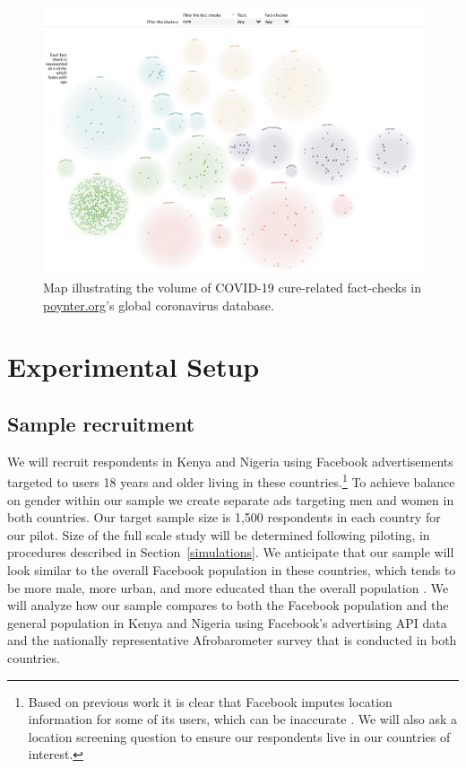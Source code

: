 \documentclass[letterpaper, 12pt, parskip=full,]{scrartcl}
\begin{document}




\begin{figure}[t]
\centering
\caption{Map illustrating the volume of COVID-19 cure-related fact-checks in \url{poynter.org}'s global coronavirus database.}
\label{fig:poynter_cures}
\includegraphics[width=.95\textwidth]{poynter_cures.png} 
\end{figure}


\FloatBarrier
\section{Experimental Setup}



\subsection{Sample recruitment}
We will recruit respondents in Kenya and Nigeria using Facebook advertisements targeted to users 18 years and older living in these countries.\footnote{Based on previous work it is clear that Facebook imputes location information for some of its users, which can be inaccurate \citep{Rosenzweig_2020}. We will also ask a location screening question to ensure our respondents live in our countries of interest.} %
To achieve balance on gender within our sample we create separate ads targeting men and women in both countries. Our target sample size is 1,500 respondents in each country for our pilot. Size of the full scale study will be determined following piloting, in procedures described in Section~\ref{simulations}. We anticipate that our sample will look similar to the overall Facebook population in these countries, which tends to be more male, more urban, and more educated than the overall population \citep{Rosenzweig_2020}. We will analyze how our sample compares to both the Facebook population and the general population in Kenya and Nigeria using Facebook's advertising API data and the nationally representative Afrobarometer survey that is conducted in both countries. 
\end{document}
